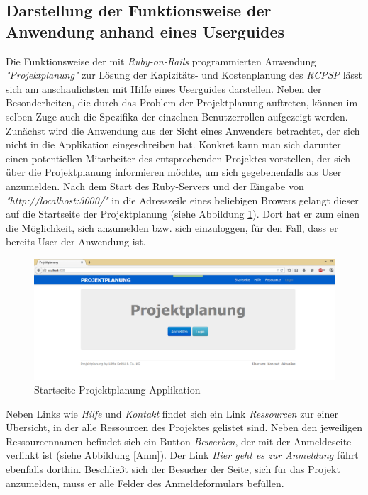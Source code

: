 \documentclass[a4paper,12pt,parskip,bibtotoc,liststotoc]{article}
\begin{document}
\subsection{Darstellung der Funktionsweise der Anwendung anhand eines Userguides}\label{User}
Die Funktionsweise der mit \textit{Ruby-on-Rails} programmierten Anwendung \textit {"Projektplanung"} zur Lösung der Kapizitäts- und Kostenplanung des \textit{RCPSP} lässt sich am anschaulichsten mit Hilfe eines Userguides darstellen. Neben der Besonderheiten, die durch das Problem der Projektplanung auftreten, können im selben Zuge auch die Spezifika der einzelnen Benutzerrollen aufgezeigt werden.\\
Zunächst wird die Anwendung aus der Sicht eines Anwenders betrachtet, der sich nicht in die Applikation eingeschreiben hat. Konkret kann man sich darunter einen potentiellen Mitarbeiter des entsprechenden Projektes vorstellen, der sich über die Projektplanung informieren möchte, um sich gegebenenfalls als User anzumelden. Nach dem Start des Ruby-Servers und der Eingabe von \textit {"http://localhost:3000/"} in die Adresszeile eines beliebigen Browers gelangt dieser auf die Startseite der Projektplanung (siehe Abbildung \ref{Start}). Dort hat er zum einen die Möglichkeit, sich anzumelden bzw. sich einzuloggen, für den Fall, dass er bereits User der Anwendung ist.\\

\begin{figure}[h!]
  \begin{center}
    \includegraphics[width=120mm]{Bilder/Startseite_unsigned.png}
    \caption{Startseite Projektplanung Applikation}  \label{Start}
  \end{center}
\end{figure}

Neben Links wie \textit{Hilfe} und \textit{Kontakt} findet sich ein Link \textit{Ressourcen} zur einer Übersicht, in der alle Ressourcen des Projektes gelistet sind. Neben den jeweiligen Ressourcennamen befindet sich ein Button \textit{Bewerben}, der mit der Anmeldeseite verlinkt ist (siehe Abbildung \ref{Anm}). Der Link \textit{Hier geht es zur Anmeldung} führt ebenfalls dorthin. Beschließt sich der Besucher der Seite, sich für das Projekt anzumelden, muss er alle Felder des Anmeldeformulars befüllen.\\
\end{document}
